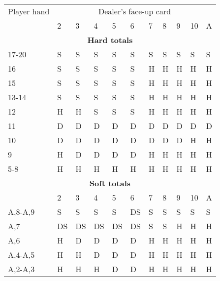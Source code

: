 \documentclass[conference]{IEEEtran}
\begin{document}
\begin{table}[ht]
\tiny
\centering
\begin{tabular}{|l|l|l|l|l|l|l|l|l|l|l|}
\hline

{Player hand} & \multicolumn{10}{c|}{Dealer's face-up card}     \\ \cline{2-11} 
                             & 2 & 3 & 4 & 5 & 6 & 7 & 8 & 9 & 10 & A \\ \hline
\multicolumn{11}{|c|}{\textbf{Hard totals}}                           \\ \hline
17-20       								 & S & S & S & S & S & S & S & S & S & S  \\ \hline
16                           & S & S & S & S & S & H & H & H & H & H  \\ \hline
15                           & S & S & S & S & S & H & H & H & H & H  \\ \hline
13-14                        & S & S & S & S & S & H & H & H & H & H  \\ \hline
12                           & H & H & S & S & S & H & H & H & H & H  \\ \hline
11                           & D & D & D & D & D & D & D & D & D & D  \\ \hline
10                           & D & D & D & D & D & D & D & D & H & H  \\ \hline
9                            & H & D & D & D & D & H & H & H & H & H  \\ \hline
5-8                          & H & H & H & H & H & H & H & H & H & H  \\ \hline

\multicolumn{11}{|c|}{\textbf{Soft totals}}                           \\ \hline
                             & 2 & 3 & 4 & 5 & 6 & 7 & 8 & 9 & 10 & A \\ \hline
A,8-A,9                      & S & S & S & S & DS & S & S & S & S & S  \\ \hline
A,7                          & DS & DS & DS & DS & DS & S & S & H & H & H  \\ \hline
A,6                          & H & D & D & D & D & H & H & H & H & H  \\ \hline
A,4-A,5                      & H & H & D & D & D & H & H & H & H & H  \\ \hline
A,2-A,3                      & H & H & H & D & D & H & H & H & H & H  \\ \hline


\end{tabular}
\end{table}
\end{document}
